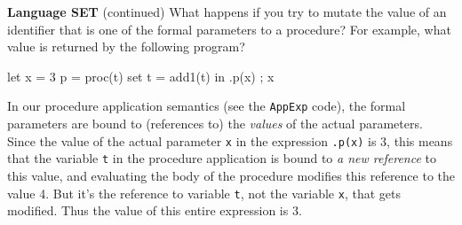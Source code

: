 \begin{minipage}[t]{\sw}
\slidenumber
\LARGE
{\bf Language SET} (continued)\exx
What happens if you try to mutate the value
of an identifier that is one of the formal parameters
to a procedure?
For example, what value is returned by the following program?
\begin{qv}
let
  x = 3
  p = proc(t) set t = add1(t)
in
  { .p(x) ; x }
\end{qv}
In our procedure application semantics
(see the \verb'AppExp' code),
the formal parameters are bound
to (references to) the {\em values} of the actual parameters.
Since the value of the actual parameter \verb'x'
in the expression \verb'.p(x)' is 3,
this means that the variable \verb't' in the procedure application
is bound to {\em a new reference} to this value,
and evaluating the body of the procedure
modifies this reference to the value 4.
But it's the reference to variable \verb't', not the variable \verb'x',
that gets modified.
Thus the value of this entire expression is 3.
\end{minipage}
\clearpage

